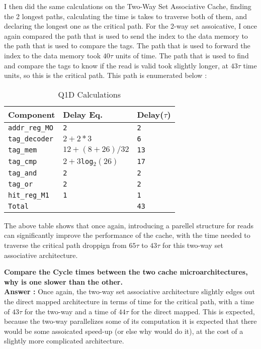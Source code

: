 \documentclass[a4paper,11pt]{article}
\newcommand{\answer}{\textbf{Answer : }}
\newcommand{\T}{\texttt}
\newcommand{\V}{\verb}
\begin{document}
I then did the same calculations on the Two-Way Set Associative Cache, finding the 2 longest paths, calculating the time is takes to traverse both of them, and declaring the longest one as the critical path. For the 2-way set assoicative, I once again compared the path that is used to send the index to the data memory to the path that is used to compare the tags. The path that is used to forward the index to the data memory took $40\tau$ units of time. The path that is used to find and compare the tags to know if the read is valid took slightly longer, at $43\tau$ time units, so this is the critical path. This path is enumerated below :


\begin{table}[H]
\caption{Q1D Calculations} \label{tab:q2Btable2} 
\begin{center}
\begin{tabular}{| l | l | l |}
\hline
  Component         &  Delay Eq.              & Delay($\tau$)          \\ \hline
  \V.addr_reg_MO.   &   \T{2}                 & \T{2}                  \\ \hline
  \V.tag_decoder.   &   \T{$2+2*3$}           & \T{6}                  \\ \hline
  \V.tag_mem.       &   \T{$12+(8+26)/32$}    & \T{13}                 \\ \hline
  \V.tag_cmp.       &   \T{$2+3$log$_2(26)$}  & \T{17}                 \\ \hline
  \V.tag_and.       &   \T{2}                 & \T{2}                  \\ \hline
  \V.tag_or.        &   \T{2}                 & \T{2}                  \\ \hline
  \V.hit_reg_M1.    &   \T{1}                 & \T{1}                  \\ \hline
  \V.Total.         &   \T{}                  & \T{43}                 \\ \hline
\end{tabular}
\end{center}
\end{table}

The above table shows that once again, introducing a parellel structure for reads can significantly improve the performance of the cache, with the time needed to traverse the critical path droppign from $65\tau$ to $43\tau$ for this two-way set associative architecture.

\textbf{Compare the Cycle times between the two cache microarchitectures, why is one slower than the other.} \\
\answer Once again, the two-way set associative architecture slightly edges out the direct mapped architecture in terms of time for the critical path, with a time of $43\tau$ for the two-way and a time of $44\tau$ for the direct mapped. This is expected, because the two-way parallelizes some of its computation it is expected that there would be some assoicated speed-up (or else why would do it), at the cost of a slightly more complicated architecture. 
\end{document}
